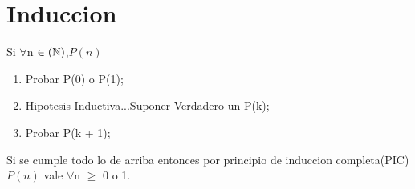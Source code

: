 \documentclass[a4paper]{article}
\begin{document}
\section{Induccion}
\begin{description}
	\item Si $\forall$n $\in (\Bbb{N})$,$P(n)$
\end{description}
	
\begin{enumerate}
	\item Probar P(0) o P(1);		
	\item Hipotesis Inductiva...Suponer Verdadero  un P(k);
	\item Probar P(k + 1);
\end{enumerate}

\begin{description}
\item Si se cumple todo lo de arriba entonces por principio de induccion completa(PIC) $P(n)$ vale $\forall$n $\geqslant$ 0  o 1.
\end{description}
\end{document}
